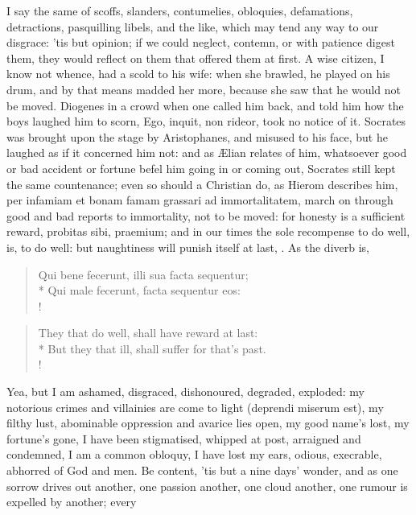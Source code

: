 {I say the same of scoffs, slanders, contumelies, obloquies,
defamations, detractions, pasquilling libels, and the like, which may
tend any way to our disgrace: 'tis but opinion; if we could neglect,
contemn, or with patience digest them, they would reflect on them that
offered them at first. A wise citizen, I know not whence, had a scold
to his wife: when she brawled, he played on his drum, and by that means
madded her more, because she saw that he would not be moved. Diogenes
in a crowd when one called him back, and told him how the boys laughed
him to scorn, Ego, inquit, non rideor, took no notice of it. Socrates
was brought upon the stage by Aristophanes, and misused to his face,
but he laughed as if it concerned him not: and as \AE{}lian relates of
him, whatsoever good or bad accident or fortune befel him going in or
coming out, Socrates still kept the same countenance; even so should a
Christian do, as Hierom describes him, per infamiam et bonam famam
grassari ad immortalitatem, march on through good and bad reports to
immortality, not to be moved: for honesty is a sufficient reward,
probitas sibi, praemium; and in our times the sole recompense to do
well, is, to do well: but naughtiness will punish itself at last,
. As the diverb is,
%
\begin{latin}%
\begin{verse}%
Qui bene fecerunt, illi sua facta sequentur;\\*
Qui male fecerunt, facta sequentur eos:\\!
\end{verse}%
\end{latin}%
\translationrule%
\begin{verse}%
They that do well, shall have reward at last:\\*
But they that ill, shall suffer for that's past.\\!
\end{verse}%
%
Yea, but I am ashamed, disgraced, dishonoured, degraded, exploded: my
notorious crimes and villainies are come to light (deprendi miserum
est), my filthy lust, abominable oppression and avarice lies open, my
good name's lost, my fortune's gone, I have been stigmatised, whipped
at post, arraigned and condemned, I am a common obloquy, I have lost my
ears, odious, execrable, abhorred of God and men. Be content, 'tis but
a nine days' wonder, and as one sorrow drives out another, one passion
another, one cloud another, one rumour is expelled by another; every
}
